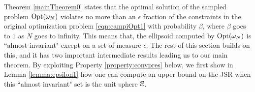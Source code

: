 Theorem \ref{mainTheorem0} states that the optimal solution of the sampled problem $\text{Opt}(\omega_N)$ violates no more than an $\epsilon$ fraction of the constraints in the original optimization problem  \eqref{eqn:campiOpt1} with probability $\beta$, where $\beta$ goes to $1$ as $N$ goes to infinity. This means that, the ellipsoid computed by $\text{Opt}(\omega_N)$ is ``almost invariant"  except on a set of measure $\epsilon$. The rest of this section builds on this, and it has two important intermediate results leading us to our main theorem. By exploiting Property \ref{property:convpres} below, we first show in Lemma \ref{lemma:epsilon1} how one can compute an upper bound on the JSR when this ``almost invariant" set is the unit sphere $\mathbb{S}$.



%
%
%
%
%
%
%













